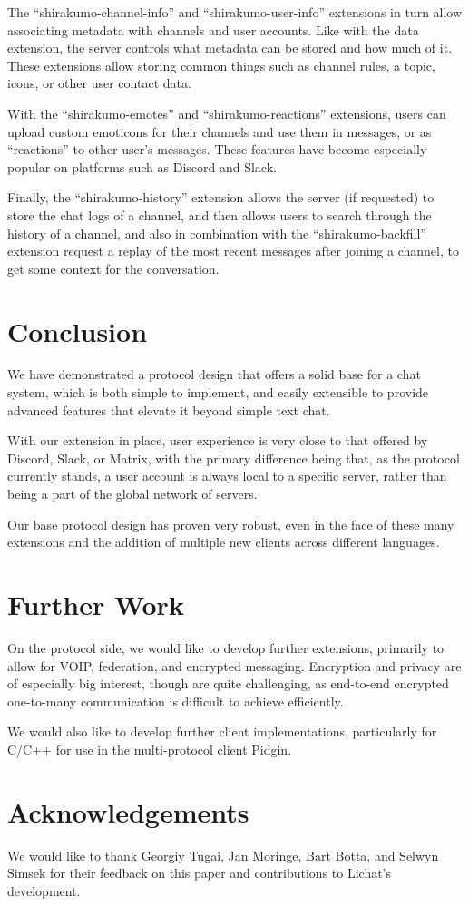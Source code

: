 \documentclass[format=sigconf]{acmart}
\begin{document}
The ``shirakumo-channel-info'' and ``shirakumo-user-info'' extensions in turn allow associating metadata with channels and user accounts. Like with the data extension, the server controls what metadata can be stored and how much of it. These extensions allow storing common things such as channel rules, a topic, icons, or other user contact data.

With the ``shirakumo-emotes'' and ``shirakumo-reactions'' extensions, users can upload custom emoticons for their channels and use them in messages, or as ``reactions'' to other user's messages. These features have become especially popular on platforms such as Discord and Slack.

Finally, the ``shirakumo-history'' extension allows the server (if requested) to store the chat logs of a channel, and then allows users to search through the history of a channel, and also in combination with the ``shirakumo-backfill'' extension request a replay of the most recent messages after joining a channel, to get some context for the conversation.

\section{Conclusion}\label{conclusion}
We have demonstrated a protocol design that offers a solid base for a chat system, which is both simple to implement, and easily extensible to provide advanced features that elevate it beyond simple text chat.

With our extension in place, user experience is very close to that offered by Discord, Slack, or Matrix, with the primary difference being that, as the protocol currently stands, a user account is always local to a specific server, rather than being a part of the global network of servers.

Our base protocol design has proven very robust, even in the face of these many extensions and the addition of multiple new clients across different languages.

\section{Further Work}\label{further-work}
On the protocol side, we would like to develop further extensions, primarily to allow for VOIP, federation, and encrypted messaging. Encryption and privacy are of especially big interest, though are quite challenging, as end-to-end encrypted one-to-many communication is difficult to achieve efficiently\cite{nabeel2017many}\cite{whisper2014}.

We would also like to develop further client implementations, particularly for C/C++ for use in the multi-protocol client Pidgin.

\section{Acknowledgements}\label{acknowledgements}
We would like to thank Georgiy Tugai, Jan Moringe, Bart Botta, and Selwyn Simsek for their feedback on this paper and contributions to Lichat's development.


\end{document}
